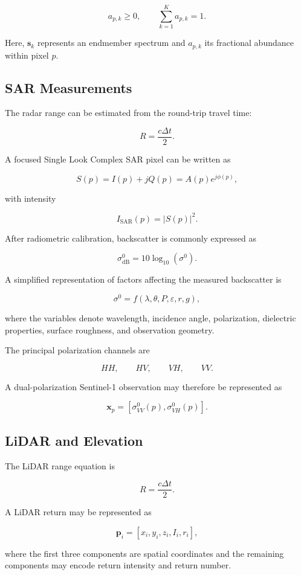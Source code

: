 \documentclass[
    11pt,
    a4paper,
    parskip=half,
    bibliography=totoc,
    numbers=noenddot
]{scrartcl}
\begin{document}
\[
a_{p,k}\geq0,
\qquad
\sum_{k=1}^{K}a_{p,k}=1.
\]

Here, \(\mathbf{s}_k\) represents an endmember spectrum and \(a_{p,k}\)
its fractional abundance within pixel \(p\).

\subsection{SAR Measurements}

The radar range can be estimated from the round-trip travel time:

\[
R=\frac{c\Delta t}{2}.
\]

A focused Single Look Complex SAR pixel can be written as

\[
S(p)=I(p)+jQ(p)=A(p)e^{j\phi(p)},
\]

with intensity

\[
I_{\mathrm{SAR}}(p)=|S(p)|^2.
\]

After radiometric calibration, backscatter is commonly expressed as

\[
\sigma^0_{\mathrm{dB}}
=
10\log_{10}(\sigma^0).
\]

A simplified representation of factors affecting the measured
backscatter is

\[
\sigma^0 =
f(\lambda,\theta,P,\varepsilon,r,g),
\]

where the variables denote wavelength, incidence angle, polarization,
dielectric properties, surface roughness, and observation geometry.

The principal polarization channels are

\[
HH,\qquad HV,\qquad VH,\qquad VV.
\]

A dual-polarization Sentinel-1 observation may therefore be represented as

\[
\mathbf{x}_p =
\left[
\sigma^0_{VV}(p),
\sigma^0_{VH}(p)
\right].
\]

\subsection{LiDAR and Elevation}

The LiDAR range equation is

\[
R=\frac{c\Delta t}{2}.
\]

A LiDAR return may be represented as

\[
\mathbf{p}_i=
[x_i,y_i,z_i,I_i,r_i],
\]

where the first three components are spatial coordinates and the
remaining components may encode return intensity and return number.
\end{document}
